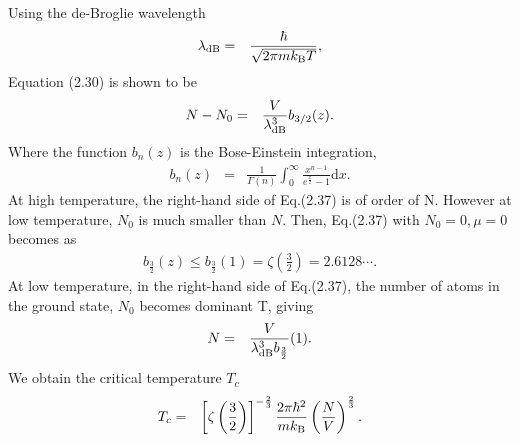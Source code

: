 \documentclass[12pt,a4paper]{report} %
\newcommand{\diff}{\mathrm{d}}				%
\newcommand{\kb} {k_{\rm B}}				%
\begin{document}
Using the de-Broglie wavelength
\begin{eqnarray}
\lambda_{\rm dB} & = & \frac{\hbar}{\sqrt{2 \pi m \kb T}},
\end{eqnarray}
Equation (2.30) is shown to be
\begin{eqnarray}
N - N_0 & = & \frac{V}{\lambda_{\rm dB}^3} b_{3/2} (z).
\end{eqnarray}
Where the function $b_{n}(z)$ is the Bose-Einstein integration, 
\begin{eqnarray}
b_n (z) & = & \frac{1}{\Gamma (n)} \int_0^\infty \frac{x^{n-1}}{e^{\frac{x}{z}}-1} \diff x.
\end{eqnarray}
At high temperature, the right-hand side of Eq.(2.37) is of order of N. However at low temperature,
$N_0$ is much smaller than $N$.
Then, Eq.(2.37) with $N_0 = 0, \mu = 0$ becomes as
\begin{eqnarray}
b_{\frac{3}{2}}(z) \leq b_{\frac{3}{2}}(1) = \zeta \left( \frac{3}{2} \right) = 2.6128 \cdots.
\end{eqnarray}
At low temperature, in the right-hand side of Eq.(2.37),
the number of atoms in the ground state, $N_0$ becomes dominant T, giving
\begin{eqnarray}
N & = & \frac{V}{\lambda_{\rm dB}^3 b_{\frac{3}{2}} }(1).
\end{eqnarray}
We obtain the critical temperature $T_c$
\begin{eqnarray}
T_c & = &
\left[ \zeta \left( \frac{3}{2} \right) \right]^{-\frac{2}{3}} \frac{2 \pi \hbar^2}{m \kb} \left( \frac{N}{V} \right)^{\frac{2}{3}}.
\end{eqnarray}
\end{document}
